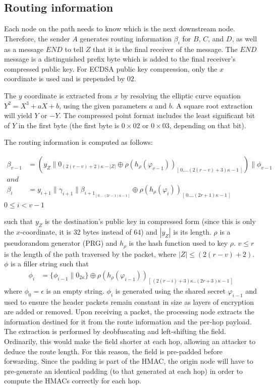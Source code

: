 \subsection{Routing information}
Each node on the path needs to know which is the next downstream node. Therefore, the sender $A$ generates routing information $\beta_i$ for $B$, $C$, and $D$, as well as a message $END$ to tell $Z$ that it is the final receiver of the message. 
The $END$ message is a distinguished prefix byte which is added to the final receiver's compressed public key.
For ECDSA public key compression, only the $x$ coordinate is used and is prepended by $02$. 

The $y$ coordinate is extracted from $x$ by resolving the elliptic curve equation $Y^2=X^3+aX+b$, using the given parameters $a$ and $b$. A square root extraction will yield $Y$ or $-Y$. The compressed point format includes the least significant bit of $Y$ in the first byte (the first byte is $0\times02$ or $0\times03$, depending on that bit).

The routing information is computed as follows:

\begin{align}  
    \beta_{v-1} &=(y_Z\|0_{(2(r-v)+2)\kappa-|Z|}\oplus \rho(h_{\rho}(\varphi_{v-1}))_{[ \,0....(2(r-v)+3)\kappa-1\,]})\|\phi_{v-1}\\
    and &\nonumber \\
    \beta_i &=y_{i+1}\|\gamma_{i+1}\|\beta_{{i+1}_{[ \,0....(2r-1)\kappa-1\,] }}\oplus \rho(h_{\rho}(\varphi_{i}))_{[ \,0....(2r+1)\kappa-1\,]} 
    \label{eq:2}
\end{align}
$0\le i < v-1$

such that $y_Z$ is the destination's public key in compressed form (since this is only the $x$-coordinate, it is 32 bytes instead of 64) and $|y_Z|$ is its length. $\rho$ is a pseudorandom generator (PRG) and $h_{\rho}$ is the hash function used to key $\rho$.
$v\leq r$ is the length of the path traversed by the packet, where $|Z| \leq (2(r - v) + 2)$. $\phi$ is a filler string such that
\begin{align}  
    \phi_i&=\{ \phi_{i-1}\|0_{2\kappa}\}\oplus \rho(h_{\rho}(\varphi_{i-1}))_{[ \,(2(r-i)+3)\kappa..(2r+3)\kappa-1\,]}
\end{align}
where $\phi_0=\epsilon$ is an empty string. $\phi_i$ is generated using the shared secret $\varphi_{i-1}$ and used to ensure the header packets remain constant in size as layers of encryption are added or removed. Upon receiving a packet, the processing node extracts the information destined for it from the route information and the per-hop payload. The extraction is performed by deobfuscating and left-shifting the field. Ordinarily, this would make the field shorter at each hop, allowing an attacker to deduce the route length. For this reason, the field is pre-padded before forwarding. Since the padding is part of the HMAC, the origin node will have to pre-generate an identical padding (to that generated at each hop) in order to compute the HMACs correctly for each hop.
    
